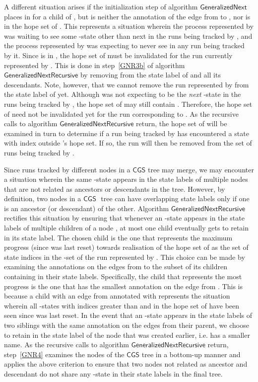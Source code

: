 \documentclass[3p]{elsarticle}
\newcommand{\CGS}{\ensuremath{\textsf{CGS }}}
\newcommand{\algo}[1]{\ensuremath{\textsf{{#1}}}}
\begin{document}
A different situation arises if the initialization step of
algorithm \algo{GeneralizedNext} places  in 
for a child  of , but  is neither the annotation of the
edge from  to , nor is in the hope set of .  This
represents a situation wherein the process represented by  was
waiting to see some -state other than  next in the runs
being tracked by , and the process represented by  was
expecting to never see  in any run being tracked by it.
Since  is in , the hope set of  must be
invalidated for the run currently represented by .  This is
done in step~\ref{GNR3b} of algorithm \algo{GeneralizedNextRecursive}
by removing  from the state label of  and all its descendants.
Note, however, that we cannot remove the run represented by 
from the state label of  yet.  Although  was not expecting 
to be the \emph{next} -state in the runs being tracked by ,
the hope set of  may still contain .  Therefore, the hope set
of  need not be invalidated yet for the run corresponding to
.  As the recursive calls to algorithm
\algo{GeneralizedNextRecursive} return, the hope set of  will be
examined in turn to determine if a run being tracked by  has
encountered a state with index outside 's hope set.  If so, the run
will then be removed from the set of runs being tracked by .
 
Since runs tracked by different nodes in a \CGS tree may merge, we may
encounter a situation wherein the same -state  appears in the
state labels of multiple nodes that are not related as ancestors or
descendants in the tree.  However, by definition, two nodes in a \CGS
tree can have overlapping state labels only if one is an ancestor (or
descendant) of the other.  Algorithm \algo{GeneralizedNextRecursive}
rectifies this situation by ensuring that whenever an -state 
appears in the state labels of multiple children of a node , at most one
child eventually gets to retain  in its state label.  The chosen child is
the one that represents the maximum progress (since  was last
reset) towards realisation of the hope set of  as the set of state
indices in the -set of the run represented by .  This choice
can be made by examining the annotations on the edges from  to the
subset of its children containing  in their state labels.  Specifically,
the child that represents the most progress is the one that has the
smallest annotation on the edge from .  This is because a child
with an edge from  annotated with  represents the situation
wherein all -states with indices greater than  and in the hope
set of  have been seen since  was last reset.  In the event that
an -state  appears in the state labels of two siblings with the same
annotation on the edges from their parent, we choose to retain  in
the state label of the node that was created earlier, i.e. has a smaller
name.  As the recursive calls to algorithm
\algo{GeneralizedNextRecursive} return, step~\ref{GNR4} examines the
nodes of the \CGS tree in a bottom-up manner and applies the above
criterion to ensure that two nodes not related as ancestor and
descendant do not share any -state in their state labels in the final
tree.
\end{document}
